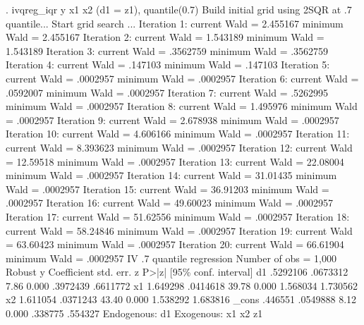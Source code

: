 . ivqreg_iqr y x1 x2 (d1 = z1), quantile(0.7)
{\smallskip}
Build initial grid using 2SQR at .7 quantile...
{\smallskip}
Start grid search ...
Iteration     1:  current Wald =  2.455167         minimum Wald =  2.455167
Iteration     2:  current Wald =  1.543189         minimum Wald =  1.543189
Iteration     3:  current Wald =  .3562759         minimum Wald =  .3562759
Iteration     4:  current Wald =   .147103         minimum Wald =   .147103
Iteration     5:  current Wald =  .0002957         minimum Wald =  .0002957
Iteration     6:  current Wald =  .0592007         minimum Wald =  .0002957
Iteration     7:  current Wald =  .5262995         minimum Wald =  .0002957
Iteration     8:  current Wald =  1.495976         minimum Wald =  .0002957
Iteration     9:  current Wald =  2.678938         minimum Wald =  .0002957
Iteration    10:  current Wald =  4.606166         minimum Wald =  .0002957
Iteration    11:  current Wald =  8.393623         minimum Wald =  .0002957
Iteration    12:  current Wald =  12.59518         minimum Wald =  .0002957
Iteration    13:  current Wald =  22.08004         minimum Wald =  .0002957
Iteration    14:  current Wald =  31.01435         minimum Wald =  .0002957
Iteration    15:  current Wald =  36.91203         minimum Wald =  .0002957
Iteration    16:  current Wald =  49.60023         minimum Wald =  .0002957
Iteration    17:  current Wald =  51.62556         minimum Wald =  .0002957
Iteration    18:  current Wald =  58.24846         minimum Wald =  .0002957
Iteration    19:  current Wald =  63.60423         minimum Wald =  .0002957
Iteration    20:  current Wald =  66.61904         minimum Wald =  .0002957
{\smallskip}
IV .7 quantile regression             Number of obs               =      1,000
             {\VBAR}               Robust
           y {\VBAR} Coefficient  std. err.      z    P>|z|     [95\% conf. interval]
          d1 {\VBAR}   .5292106   .0673312     7.86   0.000     .3972439    .6611772
          x1 {\VBAR}   1.649298   .0414618    39.78   0.000     1.568034    1.730562
          x2 {\VBAR}   1.611054   .0371243    43.40   0.000     1.538292    1.683816
       _cons {\VBAR}    .446551   .0549888     8.12   0.000      .338775     .554327
Endogenous: d1
 Exogenous: x1 x2 z1
{\smallskip}
